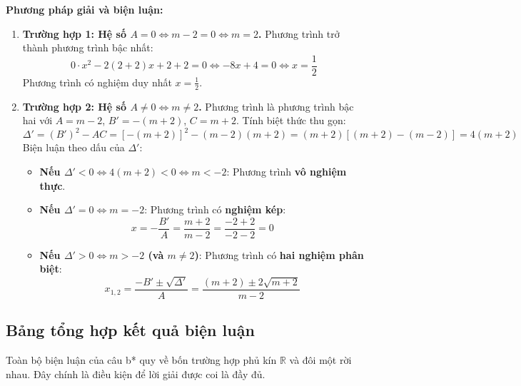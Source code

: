 \documentclass[12pt,a4paper]{article}
\begin{document}
\textbf{Phương pháp giải và biện luận:}
\begin{enumerate}
    \item \textbf{Trường hợp 1: Hệ số $A = 0 \iff m - 2 = 0 \iff m = 2$.}
    Phương trình trở thành phương trình bậc nhất:
    \begin{equation}
        0 \cdot x^2 - 2(2 + 2)x + 2 + 2 = 0 \iff -8x + 4 = 0 \iff x = \frac{1}{2}
    \end{equation}
    Phương trình có nghiệm duy nhất $x = \frac{1}{2}$.
    
    \item \textbf{Trường hợp 2: Hệ số $A \ne 0 \iff m \ne 2$.}
    Phương trình là phương trình bậc hai với $A = m - 2$, $B' = -(m + 2)$, $C = m + 2$.
    Tính biệt thức thu gọn:
    \begin{equation}
        \Delta' = (B')^2 - AC = [-(m + 2)]^2 - (m - 2)(m + 2) = (m + 2)[(m + 2) - (m - 2)] = 4(m + 2)
    \end{equation}
    Biện luận theo dấu của $\Delta'$:
    \begin{itemize}
        \item \textbf{Nếu $\Delta' < 0 \iff 4(m + 2) < 0 \iff m < -2$}:
        Phương trình \textbf{vô nghiệm thực}.
        
        \item \textbf{Nếu $\Delta' = 0 \iff m = -2$}:
        Phương trình có \textbf{nghiệm kép}:
        \begin{equation}
            x = -\frac{B'}{A} = \frac{m + 2}{m - 2} = \frac{-2 + 2}{-2 - 2} = 0
        \end{equation}
        
        \item \textbf{Nếu $\Delta' > 0 \iff m > -2$ (và $m \ne 2$)}:
        Phương trình có \textbf{hai nghiệm phân biệt}:
        \begin{equation}
            x_{1,2} = \frac{-B' \pm \sqrt{\Delta'}}{A} = \frac{(m + 2) \pm 2\sqrt{m + 2}}{m - 2}
        \end{equation}
    \end{itemize}
\end{enumerate}

\subsection{Bảng tổng hợp kết quả biện luận}

Toàn bộ biện luận của câu b* quy về bốn trường hợp phủ kín $\mathbb{R}$ và đôi một rời nhau. Đây chính là điều kiện để lời giải được coi là đầy đủ.
\end{document}
